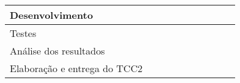 \begin{table}[H]
{\begin{tabular}{l|l|l|l|l|l|l|l|l|l|}
\multicolumn{1}{|l|}{Desenvolvimento}                           &                                                 &                          &                          &                          & \cellcolor{black} & \cellcolor{black} & \cellcolor{black} &                          &                          \\ \hline
\multicolumn{1}{|l|}{Testes}                                    &                                                 &                          &                          &                          &                          &                          & \cellcolor{black} &                          &                          \\ \hline
\multicolumn{1}{|l|}{Análise dos resultados}                    &                                                 &                          &                          &                          &                          &                          &                          & \cellcolor{black} &                          \\ \hline
\multicolumn{1}{|l|}{Elaboração e entrega do TCC2}              &                                                 &                          &                          &                          &                          &                          &                          & \cellcolor{black} & \cellcolor{black} \\ \hline
\end{tabular}}
\end{table}




